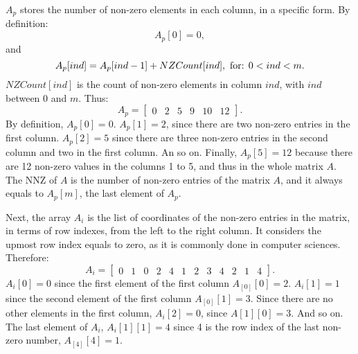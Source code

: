 $A_p$ stores the number of non-zero elements in each column, in a specific form. By definition:
\begin{equation}
	A_p[0] = 0,
\end{equation}
and
\begin{equation}
A_p[ind] = A_p[ind - 1] + NZCount[ind], \textnormal{ for: } 0 < ind < m.
\end{equation}
$NZCount[ind]$ is the count of non-zero elements in column $ind$, with $ind$ between $0$ and $m$. Thus:
	\begin{equation}
	A_p = 
	\begin{bmatrix}
	0	&2	&5	&9	&10	&12
	\end{bmatrix}
	.
	\end{equation}
By definition, ${A_p}[0] = 0$. ${A_p}[1] = 2$, since there are two non-zero entries in the first column. ${A_p}[2] = 5$ since there are three non-zero entries in the second column and two in the first column. An so on. Finally, ${A_p}[5] = 12$ because there are 12 non-zero values in the columns 1 to 5, and thus in the whole matrix $A$. The NNZ of $A$ is the number of non-zero entries of the matrix $A$, and it always equals to $A_p[m]$, the last element of $A_p$. 

Next, the array $A_i$ is the list of coordinates of the non-zero entries in the matrix, in terms of row indexes, from the left to the right column. It considers the upmost row index equals to zero, as it is commonly done in computer sciences. Therefore:
	\begin{equation}
	A_i = 
	\begin{bmatrix}
	0	&1	&0	&2	&4	&1	&2	&3	&4	&2	&1	&4
	\end{bmatrix}
	.
	\end{equation}
${A_i}[0] = 0$ since the first element of the first column $A_[0][0] = 2$. ${A_i}[1] = 1$ since the second element of the first column $A_[0][1] = 3$. Since there are no other elements in the first column, ${A_i}[2] = 0$, since $A[1][0] = 3$. And so on. The last element of $A_i$, ${A_i}[1][1] = 4$ since 4 is the row index of the last non-zero number, $A_[4][4] = 1$.
	
